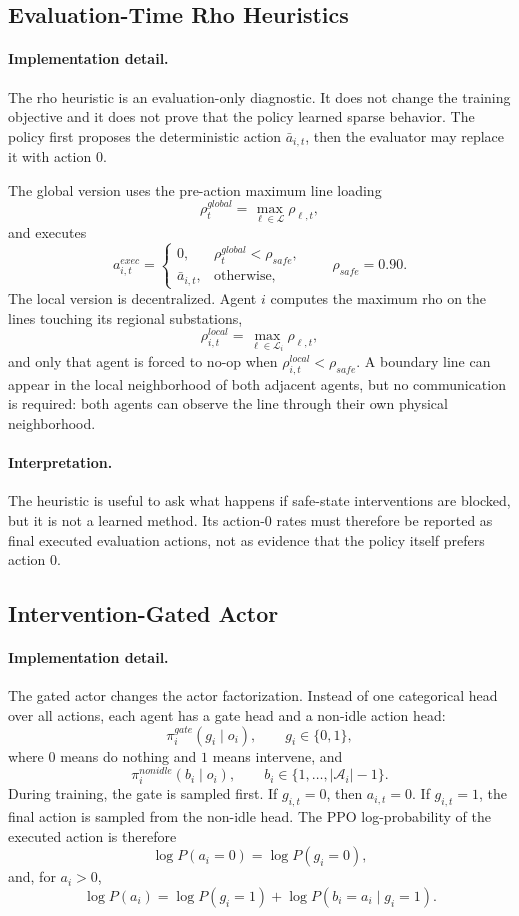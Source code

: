 \subsection{Evaluation-Time Rho Heuristics}
\label{subsec:sparse-control-heuristics}

\paragraph{Implementation detail.}
The rho heuristic is an evaluation-only diagnostic. It does not change the
training objective and it does not prove that the policy learned sparse
behavior. The policy first proposes the deterministic action \(\bar a_{i,t}\),
then the evaluator may replace it with action \(0\).

The global version uses the pre-action maximum line loading
\[
  \rho_t^{global}=\max_{\ell\in\mathcal L}\rho_{\ell,t},
\]
and executes
\[
  a_{i,t}^{exec}=
  \begin{cases}
    0, & \rho_t^{global}<\rho_{safe},\\
    \bar a_{i,t}, & \text{otherwise,}
  \end{cases}
  \qquad \rho_{safe}=0.90.
\]
The local version is decentralized. Agent \(i\) computes the maximum rho on the
lines touching its regional substations,
\[
  \rho_{i,t}^{local}=\max_{\ell\in\mathcal L_i}\rho_{\ell,t},
\]
and only that agent is forced to no-op when
\(\rho_{i,t}^{local}<\rho_{safe}\). A boundary line can appear in the local
neighborhood of both adjacent agents, but no communication is required: both
agents can observe the line through their own physical neighborhood.

\paragraph{Interpretation.}
The heuristic is useful to ask what happens if safe-state interventions are
blocked, but it is not a learned method. Its action-0 rates must therefore be
reported as final executed evaluation actions, not as evidence that the policy
itself prefers action \(0\).

\subsection{Intervention-Gated Actor}
\label{subsec:sparse-control-gate}

\paragraph{Implementation detail.}
The gated actor changes the actor factorization. Instead of one categorical
head over all actions, each agent has a gate head and a non-idle action head:
\[
  \pi_i^{gate}(g_i\mid o_i),\qquad g_i\in\{0,1\},
\]
where \(0\) means do nothing and \(1\) means intervene, and
\[
  \pi_i^{nonidle}(b_i\mid o_i),\qquad
  b_i\in\{1,\ldots,|\mathcal A_i|-1\}.
\]
During training, the gate is sampled first. If \(g_{i,t}=0\), then
\(a_{i,t}=0\). If \(g_{i,t}=1\), the final action is sampled from the non-idle
head. The PPO log-probability of the executed action is therefore
\[
  \log P(a_i=0)=\log P(g_i=0),
\]
and, for \(a_i>0\),
\[
  \log P(a_i)=\log P(g_i=1)+\log P(b_i=a_i\mid g_i=1).
\]


